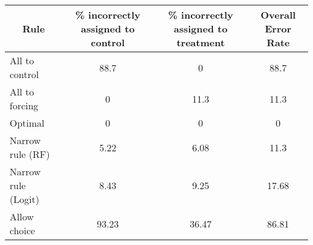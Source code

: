 \begin{tabular}{lccc}
\toprule
\multicolumn{1}{c}{Rule} & \% incorrectly assigned to control  & \% incorrectly assigned to treatment & Overall Error Rate \\
\midrule
\midrule
All to control & 88.7  & 0     & 88.7 \\
All to forcing & 0     & 11.3  & 11.3 \\
Optimal & 0     & 0     & 0 \\
Narrow rule (RF) & 5.22  & 6.08  & 11.3 \\
Narrow rule (Logit) & 8.43  & 9.25  & 17.68 \\
Allow choice & 93.23 & 36.47 & 86.81 \\
\bottomrule
\bottomrule
\end{tabular}%
